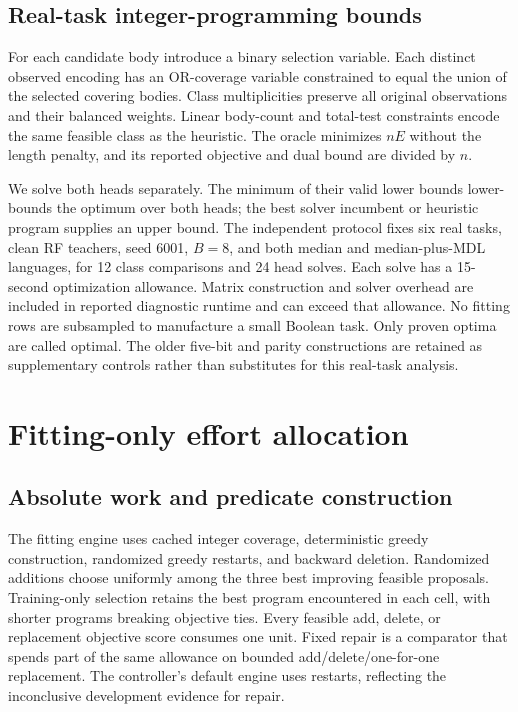 \documentclass[review,12pt]{elsarticle}
\begin{document}
\subsection{Real-task integer-programming bounds}\label{sec:real-bounds}
For each candidate body introduce a binary selection variable. Each distinct observed encoding has an OR-coverage variable constrained to equal the union of the selected covering bodies. Class multiplicities preserve all original observations and their balanced weights. Linear body-count and total-test constraints encode the same feasible class as the heuristic. The oracle minimizes $nE$ without the length penalty, and its reported objective and dual bound are divided by $n$.

We solve both heads separately. The minimum of their valid lower bounds lower-bounds the optimum over both heads; the best solver incumbent or heuristic program supplies an upper bound. The independent protocol fixes six real tasks, clean RF teachers, seed 6001, $B=8$, and both median and median-plus-MDL languages, for 12 class comparisons and 24 head solves. Each solve has a 15-second optimization allowance. Matrix construction and solver overhead are included in reported diagnostic runtime and can exceed that allowance. No fitting rows are subsampled to manufacture a small Boolean task. Only proven optima are called optimal. The older five-bit and parity constructions are retained as supplementary controls rather than substitutes for this real-task analysis.

\section{Fitting-only effort allocation}\label{sec:controller}
\subsection{Absolute work and predicate construction}
The fitting engine uses cached integer coverage, deterministic greedy construction, randomized greedy restarts, and backward deletion. Randomized additions choose uniformly among the three best improving feasible proposals. Training-only selection retains the best program encountered in each cell, with shorter programs breaking objective ties. Every feasible add, delete, or replacement objective score consumes one unit. Fixed repair is a comparator that spends part of the same allowance on bounded add/delete/one-for-one replacement. The controller's default engine uses restarts, reflecting the inconclusive development evidence for repair.
\end{document}
